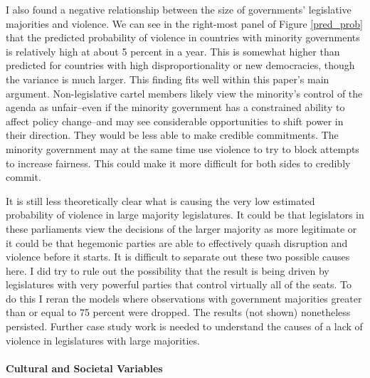 \documentclass[a4paper]{article}\usepackage[]{graphicx}\usepackage[]{color}
\begin{document}
I also found a negative relationship between the size of governments' legislative majorities and violence. We can see in the right-most panel of Figure \ref{pred_prob} that the predicted probability of violence in countries with minority governments is relatively high at about 5 percent in a year. This is somewhat higher than predicted for countries with high disproportionality or new democracies, though the variance is much larger. This finding fits well within this paper's main argument. Non-legislative cartel members likely view the minority's control of the agenda as unfair--even if the minority government has a constrained ability to affect policy change--and may see considerable opportunities to shift power in their direction. They would be less able to make credible commitments. The minority government may at the same time use violence to try to block attempts to increase fairness. This could make it more difficult for both sides to credibly commit. 

It is still less theoretically clear what is causing the very low estimated probability of violence in large majority legislatures. It could be that legislators in these parliaments view the decisions of the larger majority as more legitimate or it could be that hegemonic parties are able to effectively quash disruption and violence before it starts. It is difficult to separate out these two possible causes here. I did try to rule out the possibility that the result is being driven by legislatures with very powerful parties that control virtually all of the seats. To do this I reran the models where observations with government majorities greater than or equal to 75 percent were dropped. The results (not shown) nonetheless persisted. Further case study work is needed to understand the causes of a lack of violence in legislatures with large majorities.

\paragraph{Cultural and Societal Variables}
\end{document}
